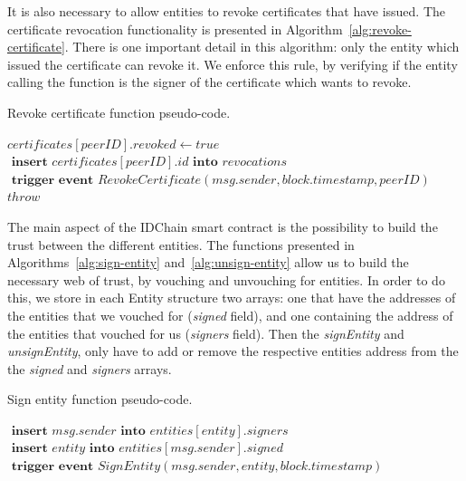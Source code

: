 It is also necessary to allow entities to revoke certificates that have issued.
The certificate revocation functionality is presented in Algorithm~\ref{alg:revoke-certificate}.
There is one important detail in this algorithm: only the entity which issued the certificate can revoke it.
We enforce this rule, by verifying if the entity calling the function is the signer of the certificate which wants to revoke.

\begin{algorithm}
  \caption{Revoke certificate function pseudo-code.}
  \label{alg:revoke-certificate}
  \begin{algorithmic}[1]
        \State $certificates[peerID].revoked \gets true$
        \State $\textbf{ insert } certificates[peerID].id \textbf{ into } revocations$
        \State $\textbf{ trigger event } RevokeCertificate(msg.sender, block.timestamp, peerID)$
      \Else
        \State $throw$
      \EndIf
    \EndFunction
  \end{algorithmic}
\end{algorithm}



The main aspect of the IDChain smart contract is the possibility to build the trust between the different entities.
The functions presented in Algorithms~\ref{alg:sign-entity} and~\ref{alg:unsign-entity} allow us to build the necessary web of trust, by vouching and unvouching for entities.
In order to do this, we store in each Entity structure two arrays: one that have the addresses of the entities that we vouched for (\textit{signed} field), and one containing the address of the entities that vouched for us (\textit{signers} field).
Then the \textit{signEntity} and \textit{unsignEntity}, only have to add or remove the respective entities address from the the \textit{signed} and \textit{signers} arrays.

\begin{algorithm}
  \caption{Sign entity function pseudo-code.}
  \label{alg:sign-entity}
  \begin{algorithmic}[1]
      \State $\textbf{ insert } msg.sender \textbf{ into } entities[entity].signers$
      \State $\textbf{ insert } entity \textbf{ into } entities[msg.sender].signed$
      \State $\textbf{ trigger event } SignEntity(msg.sender, entity, block.timestamp)$
      \State {}
    \EndFunction
  \end{algorithmic}
\end{algorithm}

